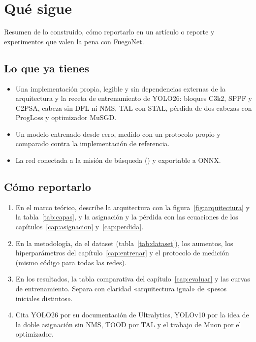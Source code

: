 \chapter{Qué sigue}
\label{cap:siguientes}

\begin{enpocas}
Resumen de lo construido, cómo reportarlo en un artículo o reporte y experimentos que valen la
pena con FuegoNet.
\end{enpocas}

\section{Lo que ya tienes}

\begin{itemize}
  \item Una implementación propia, legible y sin dependencias externas de la
        arquitectura y la receta de entrenamiento de YOLO26: bloques C3k2, SPPF y
        C2PSA, cabeza sin DFL ni NMS, TAL con STAL, pérdida de dos cabezas con
        ProgLoss y optimizador MuSGD.
  \item Un modelo entrenado desde cero, medido con un protocolo propio y
        comparado contra la implementación de referencia.
  \item La red conectada a la misión de búsqueda () y exportable
        a ONNX.
\end{itemize}

\section{Cómo reportarlo}

\begin{enumerate}
  \item En el marco teórico, describe la arquitectura con la
        figura~\ref{fig:arquitectura} y la tabla~\ref{tab:capas}, y la asignación y la
        pérdida con las ecuaciones de los capítulos~\ref{cap:asignacion}
        y~\ref{cap:perdida}.
  \item En la metodología, da el dataset (tabla~\ref{tab:dataset}), los aumentos, los
        hiperparámetros del capítulo~\ref{cap:entrenar} y el protocolo de medición
        (mismo código para todas las redes).
  \item En los resultados, la tabla comparativa del capítulo~\ref{cap:evaluar} y las
        curvas de entrenamiento. Separa con claridad «arquitectura igual» de «pesos
        iniciales distintos».
  \item Cita YOLO26 por su documentación de Ultralytics, YOLOv10 por la idea de la
        doble asignación sin NMS, TOOD por TAL y el trabajo de Muon por el optimizador.
\end{enumerate}

